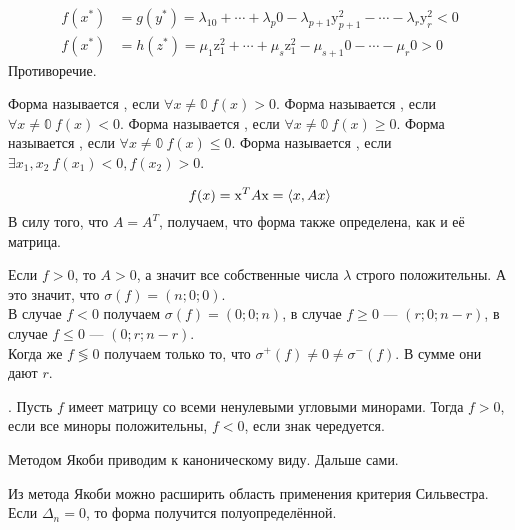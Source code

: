 \documentclass{article}
\begin{document}
\begin{itemize}
\begin{Proof}
            \[\begin{split}
                f(x^*)&=g(y^*)=\lambda_10+\cdots+\lambda_p0-\lambda_{p+1}\mathrm y_{p+1}^2-\cdots-\lambda_r\mathrm y_r^2<0\\
                f(x^*)&=h(z^*)=\mu_1\mathrm z_1^2+\cdots+\mu_s\mathrm z_1^2-\mu_{s+1}0-\cdots-\mu_r0>0
            \end{split}\]
            Противоречие.
        \end{Proof}
        \dfn Форма называется , если $\forall x\neq\mathbb0~f(x)>0$.
        \dfn Форма называется , если $\forall x\neq\mathbb0~f(x)<0$.
        \dfn Форма называется , если $\forall x\neq\mathbb0~f(x)\geqslant0$.
        \dfn Форма называется , если $\forall x\neq\mathbb0~f(x)\leqslant0$.
        \dfn Форма называется , если $\exists x_1,x_2~f(x_1)<0,f(x_2)>0$.
        \begin{Comment}
            $$
            f(x)=\mathrm x^TA\mathrm x={\left\langle{x},{Ax}\right\rangle}
            $$
            В силу того, что $A=A^T$, получаем, что форма также определена, как и её матрица.
        \end{Comment}
        \begin{Comment}
            Если $f>0$, то $A>0$, а значит все собственные числа $\lambda$ строго положительны. А это значит, что $\sigma(f)=(n;0;0)$.\\
            В случае $f<0$ получаем $\sigma(f)=(0;0;n)$, в случае $f\geqslant0$ --- $(r;0;n-r)$, в случае $f\leqslant0$ --- $(0;r;n-r)$.\\
            Когда же $f\lessgtr0$ получаем только то, что $\sigma^+(f)\neq0\neq\sigma^-(f)$. В сумме они дают $r$.
        \end{Comment}
        \thm {}. Пусть $f$ имеет матрицу со всеми ненулевыми угловыми минорами. Тогда $f>0$, если все миноры положительны, $f<0$, если знак чередуется.
        \begin{Proof}
            Методом Якоби приводим к каноническому виду. Дальше сами.
        \end{Proof}
        \begin{Comment}
            Из метода Якоби можно расширить область применения критерия Сильвестра. Если $\Delta_n=0$, то форма получится полуопределённой.
        \end{Comment}
    \end{itemize}
\end{document}
